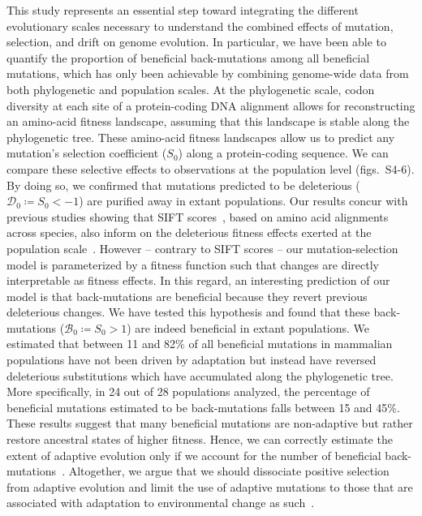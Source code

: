 \documentclass[9pt,twocolumn,twoside,lineno]{pnas-new}
\newcommand{\Sphy}{S_{0}}
\newcommand{\SphyDel}{\mathcal{D}_0}
\newcommand{\SphyBen}{\mathcal{B}_0}
\begin{document}
This study represents an essential step toward integrating the different evolutionary scales necessary to understand the combined effects of mutation, selection, and drift on genome evolution.
In particular, we have been able to quantify the proportion of beneficial back-mutations among all beneficial mutations, which has only been achievable by combining genome-wide data from both phylogenetic and population scales.
At the phylogenetic scale, codon diversity at each site of a protein-coding DNA alignment allows for reconstructing an amino-acid fitness landscape, assuming that this landscape is stable along the phylogenetic tree.
These amino-acid fitness landscapes allow us to predict any mutation’s selection coefficient ($\Sphy$) along a protein-coding sequence.
We can compare these selective effects to observations at the population level (figs.~S4-6).
By doing so, we confirmed that mutations predicted to be deleterious ($\SphyDel \coloneqq \Sphy < -1$) are purified away in extant populations.
Our results concur with previous studies showing that SIFT scores~\cite{ng_sift_2003, vaser_sift_2016}, based on amino acid alignments across species, also inform on the deleterious fitness effects exerted at the population scale~\cite{chen_hunting_2021}.
However – contrary to SIFT scores – our mutation-selection model is parameterized by a fitness function such that changes are directly interpretable as fitness effects.
In this regard, an interesting prediction of our model is that back-mutations are beneficial because they revert previous deleterious changes.
We have tested this hypothesis and found that these back-mutations ($\SphyBen \coloneqq \Sphy > 1 $) are indeed beneficial in extant populations.
We estimated that between 11 and 82\% of all beneficial mutations in mammalian populations have not been driven by adaptation but instead have reversed deleterious substitutions which have accumulated along the phylogenetic tree.
More specifically, in 24 out of 28 populations analyzed, the percentage of beneficial mutations estimated to be back-mutations falls between 15 and 45\%.
These results suggest that many beneficial mutations are non-adaptive but rather restore ancestral states of higher fitness.
Hence, we can correctly estimate the extent of adaptive evolution only if we account for the number of beneficial back-mutations~\cite{keightley_what_2010, rice_evolutionarily_2015}.
Altogether, we argue that we should dissociate positive selection from adaptive evolution and limit the use of adaptive mutations to those that are associated with adaptation to environmental change as such~\cite{charlesworth_other_2007, mustonen_fitness_2009}.
\end{document}
